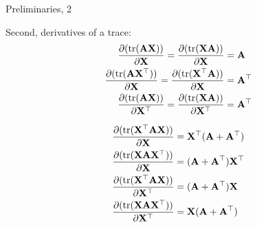 \documentclass{beamer}
\begin{document}
\begin{frame}{Preliminaries, 2}
	\begin{flushleft}
		
		Second, derivatives of a trace:
		\begin{align}
			\frac{\partial ( \text{tr}(\mathbf{A} \mathbf{X}) )}{\partial \mathbf{X}} = 
			\frac{\partial ( \text{tr}(\mathbf{X}\mathbf{A}) )}{\partial \mathbf{X}} 
			&= 
			\mathbf{A}
			\\
			\frac{\partial ( \text{tr}(\mathbf{A} \mathbf{X}^\top) )}{\partial \mathbf{X}} = 
			\frac{\partial ( \text{tr}(\mathbf{X}^\top\mathbf{A}) )}{\partial \mathbf{X}} 
			&= 
			\mathbf{A}^\top	
			\\
			\frac{\partial ( \text{tr}(\mathbf{A} \mathbf{X}) )}{\partial \mathbf{X}^\top} = 
			\frac{\partial ( \text{tr}(\mathbf{X}\mathbf{A}) )}{\partial \mathbf{X}^\top} 
			&= 
			\mathbf{A}^\top		
		\end{align}
	
		\begin{align}
			\frac{\partial ( \text{tr}(\mathbf{X}^\top \mathbf{A} \mathbf{X}) )}{\partial \mathbf{X}} 
			&=
			 \mathbf{X}^\top (\mathbf{A} + \mathbf{A}^\top)
			 \\
			 \frac{\partial ( \text{tr}(\mathbf{X} \mathbf{A} \mathbf{X}^\top) )}{\partial \mathbf{X}} 
			 &=
			  (\mathbf{A} + \mathbf{A}^\top) \mathbf{X}^\top
			 \\
			 \frac{\partial ( \text{tr}(\mathbf{X}^\top \mathbf{A} \mathbf{X}) )}{\partial \mathbf{X}^\top} 
			 &=
			 (\mathbf{A} + \mathbf{A}^\top) \mathbf{X}
			 \\
			 \frac{\partial ( \text{tr}(\mathbf{X} \mathbf{A} \mathbf{X}^\top) )}{\partial \mathbf{X}^\top} 
			 &=
			 \mathbf{X}(\mathbf{A} + \mathbf{A}^\top)
		\end{align}
		
			
		
	\end{flushleft}
\end{frame}
\end{document}
